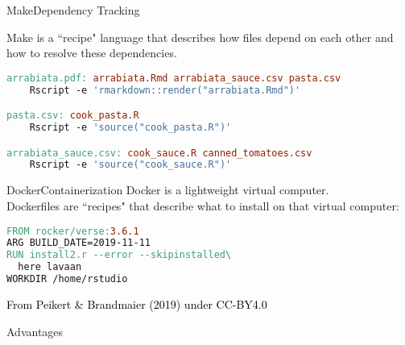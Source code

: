 \documentclass[12pt,t]{beamer}
\begin{document}
{\begin{frame}[c, fragile]{Make\textemdash{}Dependency Tracking}

Make is a ``recipe" language that describes how files depend on each other and how to resolve these dependencies.
\vspace{10mm}
\begin{lstlisting}[language=make,basicstyle=\ttfamily\scriptsize]
arrabiata.pdf: arrabiata.Rmd arrabiata_sauce.csv pasta.csv
    Rscript -e 'rmarkdown::render("arrabiata.Rmd")'

pasta.csv: cook_pasta.R
    Rscript -e 'source("cook_pasta.R")'

arrabiata_sauce.csv: cook_sauce.R canned_tomatoes.csv
    Rscript -e 'source("cook_sauce.R")'
\end{lstlisting}
\end{frame}

\begin{frame}[c, fragile]{Docker\textemdash{}Containerization}
	Docker is a lightweight virtual computer.\\
	Dockerfiles are ``recipes" that describe what to install on that virtual computer:
	\vspace{10mm}
	\begin{lstlisting}[language=make,basicstyle=\ttfamily\scriptsize]
FROM rocker/verse:3.6.1
ARG BUILD_DATE=2019-11-11
RUN install2.r --error --skipinstalled\
  here lavaan
WORKDIR /home/rstudio
\end{lstlisting}
\end{frame}

  \begin{frame}[plain]
  \vspace{8cm}
  \scriptsize \hfill{}\textcolor{black}{From Peikert \& Brandmaier (2019) under CC-BY4.0}
  \end{frame}
}

\begin{frame}[c]{Advantages}
	\begin{center}
	\end{center}
\end{frame}

\begin{frame}[c]
  \Huge
\end{frame}
\end{document}
